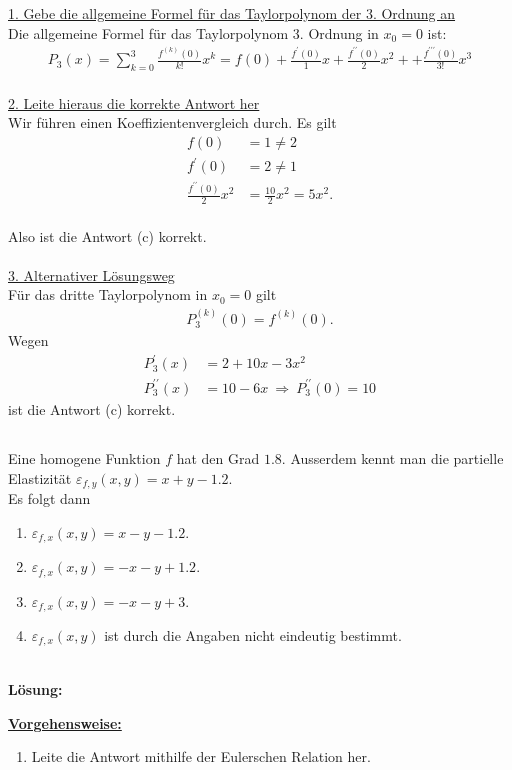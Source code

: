 \underline{1. Gebe die allgemeine Formel für das Taylorpolynom der 3. Ordnung an}\\
Die allgemeine Formel für das Taylorpolynom 3. Ordnung in $ x_0 =0 $ ist:
\begin{align*}
P_3 (x) = \sum \limits_{k=0}^3 \frac{f^{(k)}(0)}{k!} x^k
= f(0) + \frac{f^\prime(0)}{1} x
+ \frac{f^{\prime \prime }(0)}{2}x^2 +
+ \frac{f^{\prime \prime \prime}(0)}{3!} x^3
\end{align*}
\ \\
\underline{2. Leite hieraus die korrekte Antwort her}\\
Wir führen einen Koeffizientenvergleich durch. Es gilt
\begin{align*}
 f(0) &= 1 \neq 2\\
 f^\prime(0) &= 2 \neq 1\\
 \frac{f^{\prime \prime}(0)}{2} x^2  &= \frac{10}{2} x^2= 5 x^2 .
\end{align*}
\ \\
Also ist die Antwort (c) korrekt.\\
\ \\
\underline{3. Alternativer Lösungsweg}\\
Für das dritte Taylorpolynom in $ x_0 = 0 $ gilt
\begin{align*}
P_3^{(k)}(0) = f^{(k)}(0).
\end{align*}
Wegen 
\begin{align*}
P_3^\prime(x) &= 2 + 10 x - 3 x^2\\
P_3^{\prime \prime}(x) &= 10 - 6 x
\ \Rightarrow \ 
P_3^{\prime \prime}(0) = 10
\end{align*}
ist die Antwort (c) korrekt.

\newpage

\subsection*{}
Eine homogene Funktion $ f $ hat den Grad $ 1.8 $.
Ausserdem kennt man die partielle Elastizität
$ \varepsilon_{f,y}(x,y) = x +y -1.2 $.\\
Es folgt dann 
\renewcommand{\labelenumi}{(\alph{enumi})}
\begin{enumerate}
	\item 
	$ \varepsilon_{f,x}(x,y) = x-y -1.2 $.
	\item
	$ \varepsilon_{f,x}(x,y) = -x-y +1.2 $.
	\item
	$ \varepsilon_{f,x}(x,y) = -x-y +3 $.
	\item
	$ \varepsilon_{f,x}(x,y) $ ist durch die Angaben nicht eindeutig bestimmt.
\end{enumerate}
\ \\
\textbf{Lösung:}
\begin{mdframed}
	\underline{\textbf{Vorgehensweise:}}
	\renewcommand{\labelenumi}{\theenumi.}
	\begin{enumerate}
		\item Leite die Antwort mithilfe der Eulerschen Relation her.
	\end{enumerate}
\end{mdframed}

